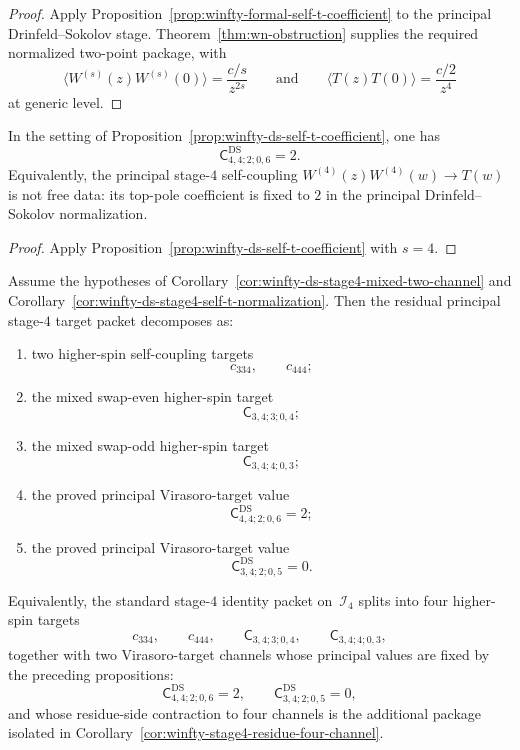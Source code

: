 \begin{proof}
Apply Proposition~\ref{prop:winfty-formal-self-t-coefficient} to the
principal Drinfeld--Sokolov stage. Theorem~\ref{thm:wn-obstruction}
supplies the required normalized two-point package, with
\[
\langle W^{(s)}(z)W^{(s)}(0)\rangle=\frac{c/s}{z^{2s}}
\qquad\text{and}\qquad
\langle T(z)T(0)\rangle=\frac{c/2}{z^4}
\]
at generic level.
\end{proof}

\begin{corollary}
\label{cor:winfty-ds-stage4-self-t-normalization}
In the setting of Proposition~\ref{prop:winfty-ds-self-t-coefficient},
one has
\[
\mathsf{C}^{\mathrm{DS}}_{4,4;2;0,6}=2.
\]
Equivalently, the principal stage-$4$ self-coupling
$W^{(4)}(z)W^{(4)}(w)\to T(w)$ is not free data: its top-pole
coefficient is fixed to $2$ in the principal Drinfeld--Sokolov
normalization.
\end{corollary}

\begin{proof}
Apply Proposition~\ref{prop:winfty-ds-self-t-coefficient} with $s=4$.
\end{proof}

\begin{corollary}
\label{cor:winfty-ds-stage4-five-plus-zero}
Assume the hypotheses of
Corollary~\ref{cor:winfty-ds-stage4-mixed-two-channel} and
Corollary~\ref{cor:winfty-ds-stage4-self-t-normalization}. Then the
residual principal stage-$4$ target packet decomposes as:
\begin{enumerate}[label=\textup{(\roman*)}]
\item two higher-spin self-coupling targets
 \[
 c_{334},\qquad c_{444};
 \]
\item the mixed swap-even higher-spin target
 \[
 \mathsf{C}_{3,4;3;0,4};
 \]
\item the mixed swap-odd higher-spin target
 \[
 \mathsf{C}_{3,4;4;0,3};
 \]
\item the proved principal Virasoro-target value
 \[
 \mathsf{C}^{\mathrm{DS}}_{4,4;2;0,6}=2;
 \]
\item the proved principal Virasoro-target value
 \[
 \mathsf{C}^{\mathrm{DS}}_{3,4;2;0,5}=0.
 \]
\end{enumerate}
Equivalently, the standard stage-$4$ identity packet on~$\mathcal{I}_4$
splits into four higher-spin targets
\[
c_{334},\qquad c_{444},\qquad
\mathsf{C}_{3,4;3;0,4},\qquad \mathsf{C}_{3,4;4;0,3},
\]
together with two Virasoro-target channels whose principal values are
fixed by the preceding propositions:
\[
\mathsf{C}^{\mathrm{DS}}_{4,4;2;0,6}=2,
\qquad
\mathsf{C}^{\mathrm{DS}}_{3,4;2;0,5}=0,
\]
and whose residue-side contraction to four channels is the additional
package isolated in
Corollary~\ref{cor:winfty-stage4-residue-four-channel}.
\end{corollary}

